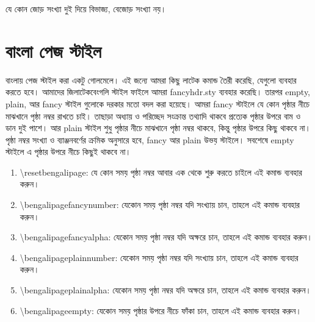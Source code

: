 \begin{corollary}
যে কোন জোড় সংখ্যা দুই দিয়ে বিভাজ্য, বেজোড় সংখ্যা নয়।
\end{corollary}


\section{বাংলা পেজ স্টাইল}
বাংলায় পেজ স্টাইল করা একটু গোলমেলে। এই জন্যে আমরা কিছু লাটেক কমান্ড তৈরী করেছি, যেগুলো ব্যবহার করতে হবে। আমাদের জিলাটেকবেংগলি স্টাইল ফাইলে আমরা fancyhdr.sty ব্যবহার করেছি। তারপর empty, plain, আর fancy স্টাইল গুলোকে দরকার মতো বদল করা হয়েছে। আমরা fancy স্টাইলে যে কোন পৃষ্ঠার নীচে মাঝখানে পৃষ্ঠা নম্বর রাখতে চাই। তাছাড়া অধ্যায় ও পরিচ্ছেদ সংক্রান্ত তথ্যাদি থাকবে প্রত্যেক পৃষ্ঠার উপরে বাম ও ডান দুই পাশে। আর plain স্টাইল শুধু পৃষ্ঠার নীচে মাঝখানে পৃষ্ঠা নম্বর থাকবে, কিন্তু পৃষ্ঠার উপরে কিছু থাকবে না। পৃষ্ঠা নম্বর সংখ্যা ও ব্যাঞ্জনবর্ণের ক্রমিক অনুসারে হবে, fancy আর plain উভয় স্টাইলে। সবশেষে empty স্টাইলে এ পৃষ্ঠার উপরে নীচে কিছুই থাকবে না।

\begin{enumerate}
\item \textbackslash{\rm resetbengalipage}: যে কোন সময় পৃষ্ঠা নম্বর আবার এক থেকে শুরু করতে চাইলে এই কমান্ড ব্যবহার করুন।
\item \textbackslash{\rm bengalipagefancynumber}: যেকোন সময় পৃষ্ঠা নম্বর যদি সংখ্যায় চান, তাহলে এই কমান্ড ব্যবহার করুন।
\item \textbackslash{\rm bengalipagefancyalpha}: যেকোন সময় পৃষ্ঠা নম্বর যদি অক্ষরে চান, তাহলে এই কমান্ড ব্যবহার করুন।
\item \textbackslash{\rm bengalipageplainnumber}: যেকোন সময় পৃষ্ঠা নম্বর যদি সংখ্যায় চান, তাহলে এই কমান্ড ব্যবহার করুন।
\item \textbackslash{\rm bengalipageplainalpha}: যেকোন সময় পৃষ্ঠা নম্বর যদি অক্ষরে চান, তাহলে এই কমান্ড ব্যবহার করুন।
\item \textbackslash{\rm bengalipageempty}: যেকোন সময় পৃষ্ঠার উপরে নীচে ফাঁকা চান, তাহলে এই কমান্ড ব্যবহার করুন।
\end{enumerate}

